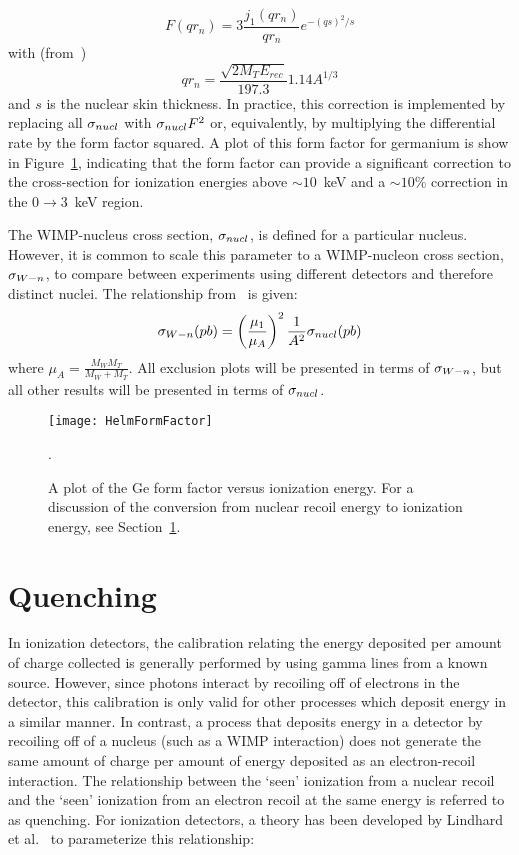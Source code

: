 		\begin{equation}
			F (q r_{n}) = 3 \frac{j_{1}(q r_{n})}{q r_{n}} e^{-(q s)^{2}/s}
			\label{eqn:WSHelmFF}
		\end{equation}
with (from~\cite{Lew96})
		\[
			q r_{n} = \frac{\sqrt{2  M_{T} E_{rec}}}{197.3} 1.14 A^{1/3}
		\]
and $s$ is the nuclear skin thickness.  In practice, this correction is implemented by replacing all $\sigma_{nucl}$ with $\sigma_{nucl} F^{2}$ or, equivalently, by multiplying the differential rate by the form factor squared.  A plot of this form factor for germanium is show in Figure~\ref{fig:HelmFF}, indicating that the form factor can provide a significant correction to the cross-section for ionization energies above $\sim10$~keV and a $\sim10$\% correction in the 0$\to$3~keV region.  

The WIMP-nucleus cross section, $\sigma_{nucl}$, is defined for a particular nucleus.  However, it is common to scale this parameter to a WIMP-nucleon cross section, $\sigma_{W-n}$, to compare between experiments using different detectors and therefore distinct nuclei.  The relationship from~\cite{Alner2005444} is given: 
		\begin{equation}
			\sigma_{W-n} (pb) = \left( \frac{\mu_{1}}{\mu_{A}} \right)^{2}\frac{1}{A^{2}} \sigma_{nucl} (pb)
			\label{eqn:SigmaConversion}
		\end{equation}
where $\mu_{A} = \frac{M_{W} M_{T}}{M_{W} + M_{T}}$.  All exclusion plots will be presented in terms of $\sigma_{W-n}$, but all other results will be presented in terms of $\sigma_{nucl}$.

		\begin{figure}
			\centering
			\texttt{[image: HelmFormFactor]}
			\caption[A plot of the Ge form factor versus ionization energy]
			{A plot of the Ge form factor versus ionization energy.  For a discussion of the 
			conversion from nuclear recoil energy to ionization energy, see 
			Section~\ref{sec:ResultsQuenching}.}
			\label{fig:HelmFF}.
		\end{figure}
	\section{Quenching}
	\label{sec:ResultsQuenching}
In ionization detectors, the calibration relating the energy deposited per amount of charge collected is generally performed by using gamma lines from a known source.  However, since photons interact by recoiling off of electrons in the detector, this calibration is only valid for other processes which deposit energy in a similar manner.  In contrast, a process that deposits energy in a detector by recoiling off of a nucleus (such as a WIMP interaction) does not generate the same amount of charge per amount of energy deposited as an electron-recoil interaction.  The relationship between the `seen' ionization from a nuclear recoil and the `seen' ionization from an electron recoil at the same energy is referred to as quenching.  For ionization detectors, a theory has been developed by Lindhard et al.~\cite{Lindhard:1961fa} to parameterize this relationship:

